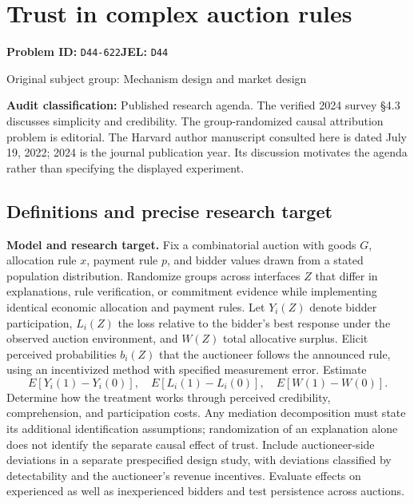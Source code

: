 \documentclass[11pt,a4paper]{article}
\begin{document}
\section*{Trust in complex auction rules}
\textbf{Problem ID:} \texttt{D44-622}\quad \textbf{JEL:} \texttt{D44}\par
\label{problem:OP-0295}
{\sffamily\small\color{muted}Original subject group: Mechanism design and market design\par}
\label{definitions:problem:30007577}
\textbf{Audit classification:} Published research agenda. The verified 2024 survey §4.3 discusses simplicity and credibility. The group-randomized causal attribution problem is editorial. The Harvard author manuscript consulted here is dated July 19, 2022; 2024 is the journal publication year. Its discussion motivates the agenda rather than specifying the displayed experiment.
\subsection*{Definitions and precise research target}
\textbf{Model and research target.} Fix a combinatorial auction with goods \(G\), allocation rule \(x\), payment rule \(p\), and bidder values drawn from a stated population distribution. Randomize groups across interfaces \(Z\) that differ in explanations, rule verification, or commitment evidence while implementing identical economic allocation and payment rules. Let \(Y_i(Z)\) denote bidder participation, \(L_i(Z)\) the loss relative to the bidder's best response under the observed auction environment, and \(W(Z)\) total allocative surplus. Elicit perceived probabilities \(b_i(Z)\) that the auctioneer follows the announced rule, using an incentivized method with specified measurement error. Estimate
\[
 E[Y_i(1)-Y_i(0)],\quad E[L_i(1)-L_i(0)],\quad E[W(1)-W(0)].
\]
Determine how the treatment works through perceived credibility, comprehension, and participation costs. Any mediation decomposition must state its additional identification assumptions; randomization of an explanation alone does not identify the separate causal effect of trust. Include auctioneer-side deviations in a separate prespecified design study, with deviations classified by detectability and the auctioneer's revenue incentives. Evaluate effects on experienced as well as inexperienced bidders and test persistence across auctions.
\end{document}
